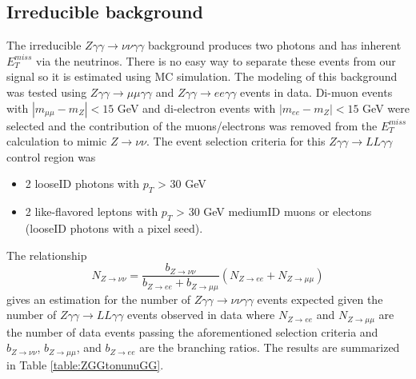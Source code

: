 


\subsection{Irreducible background}
The irreducible $Z \gamma \gamma \rightarrow \nu \nu \gamma \gamma$ background produces two photons and has inherent $E^{miss}_T$ via the neutrinos.  There is no easy way to separate these events from our signal so it is estimated using MC simulation.  The modeling of this background was tested using $Z\gamma \gamma \rightarrow \mu \mu \gamma \gamma$ and $Z\gamma \gamma \rightarrow ee \gamma \gamma$ events in data.  Di-muon events with $|m_{\mu \mu} - m_Z|<15$ GeV and di-electron events with $|m_{ee}-m_Z|<15$ GeV were selected and the contribution of the muons/electrons was removed from the $E^{miss}_T$ calculation to mimic $Z\rightarrow \nu \nu$.  The event selection criteria for this $Z \gamma \gamma \rightarrow LL \gamma \gamma$ control region was
\begin{itemize}
	\item 2 looseID photons with $p_T$ > 30 GeV
	\item 2 like-flavored leptons with $p_T$ > 30 GeV
	 mediumID muons or
	 electons (looseID photons with a pixel seed).
\end{itemize}
The relationship
\begin{equation}
	N_{Z\rightarrow \nu \nu} = \frac{b_{Z\rightarrow \nu \nu}}{b_{Z\rightarrow ee}+b_{Z\rightarrow \mu \mu}}(N_{Z\rightarrow ee}+N_{Z\rightarrow \mu \mu})
	\label{equation:zggtonunugg}
\end{equation}
gives an estimation for the number of $Z \gamma \gamma \rightarrow \nu \nu \gamma \gamma$ events expected given the number of $Z \gamma \gamma \rightarrow LL \gamma \gamma$ events observed in data where $N_{Z\rightarrow ee}$ and $N_{Z\rightarrow \mu \mu}$ are the number of data events passing the aforementioned selection criteria and $b_{Z\rightarrow \nu \nu}$, $b_{Z\rightarrow \mu \mu}$, and $b_{Z\rightarrow ee}$ are the branching ratios.  The results are summarized in Table \ref{table:ZGGtonunuGG}.

